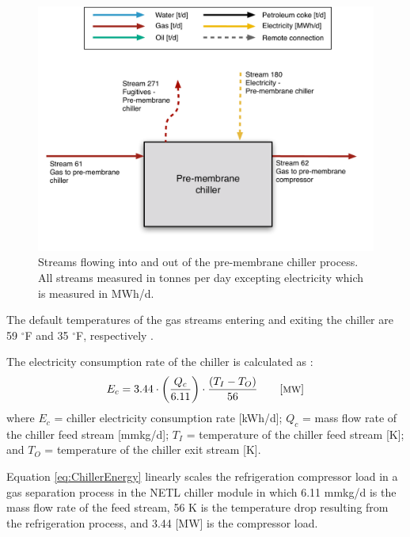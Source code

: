 \documentclass[11pt]{report}
\newcommand{\marg}[1]{{\footnotesize\textit{\textcolor{stanford}{'#1'}}}}
\newcommand{\marginnote}[1]{\marginpar{\marg{#1}}}
\begin{document}
\begin{figure}
\includegraphics[width=0.85\columnwidth]{images/Pre-membrane_chiller_PF.pdf}
\caption{Streams flowing into and out of the pre-membrane chiller process. All streams measured in tonnes per day excepting electricity which is measured in MWh/d.}
\label{fig:chiller_PF}
\end{figure}



The default temperatures of the gas streams entering and exiting the chiller are 59 $^{\circ}${F} and 35 $^{\circ}${F}, respectively \cite{NETLChillerModel}.



The electricity consumption rate of the chiller is calculated as \cite{NETLChillerModel}: \marginnote{Surface \\ Processing 2.2.6}
\begin{equation} \label{eq:ChillerEnergy}
E_{c}=3.44\cdot\left(\frac{Q_{c}}{6.11}\right)\cdot\frac{\left(T_{I}-T_{O}\right)}{56} \quad \quad \begin{footnotesize}[{\text{MW}}] \end{footnotesize}
\end{equation}
where $E_{c}$ = chiller electricity consumption rate [kWh/d]; $Q_{c}$ = mass flow rate of the chiller feed stream [mmkg/d]; $T_{I}$ = temperature of the chiller feed stream [{K}]; and $T_{O}$ = temperature of the chiller exit stream [{K}]. 

Equation \ref{eq:ChillerEnergy} linearly scales the refrigeration compressor load in a gas separation process in the NETL chiller module \cite{NETLChillerModel} in which 6.11 mmkg/d is the mass flow rate of the feed stream, 56 {K} is the temperature drop resulting from the refrigeration process, and 3.44 [MW] is the compressor load.
\end{document}
